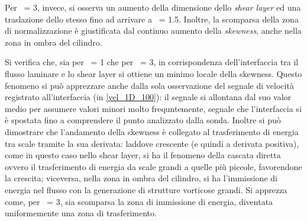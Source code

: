 \documentclass{article} %
\newcommand{\xd}{\nicefrac{\textrm{x}}{\textrm{D}}\ }
\newcommand{\yd}{\nicefrac{\textrm{y}}{\textrm{D}}\ }
\begin{document}
\begin{minipage}[t]{0.5\textwidth}
	\centering
	\begin{minipage}[t]{0.95\textwidth} \onehalfspacing
		Per \xd = 3, invece, si osserva un aumento della dimensione dello \textit{shear layer} ed una traslazione dello stesso fino ad arrivare a \yd = 1.5. Inoltre, la scomparsa della zona di normalizzazione è giustificata dal continuo aumento della \textit{skewness}, anche nella zona in ombra del cilindro.\par
		Si verifica che, sia per \xd = 1 che per \xd = 3, in corrispondenza dell'interfaccia tra il flusso laminare e lo shear layer si ottiene un minimo locale della skewness. Questo fenomeno si può apprezzare anche dalla sola osservazione del segnale di velocità registrato all'interfaccia (in \cref{vel_1D_100}): il segnale si allontana dal suo valor medio per assumere valori minori molto frequntemente, segnale che l'interfaccia si è spostata fino a comprendere il punto analizzato dalla sonda. Inoltre si può dimostrare che l'andamento della skewness è collegato al trasferimento di energia tra scale tramite la sua derivata: laddove crescente (e quindi a derivata positiva), come in questo caso nello shear layer, si ha il fenomeno della cascata diretta ovvero il trasferimento di energia da scale grandi a quelle più piccole, favorendone la crescita; viceversa, nella zona in ombra del cilindro, si ha l'immissione di energia nel flusso con la generazione di strutture vorticose grandi. Si apprezza come, per \xd = 3, sia scomparsa la zona di immissione di energia, diventata uniformemente una zona di trasferimento.
	\end{minipage}
\end{minipage}
\newpage
\end{document}
